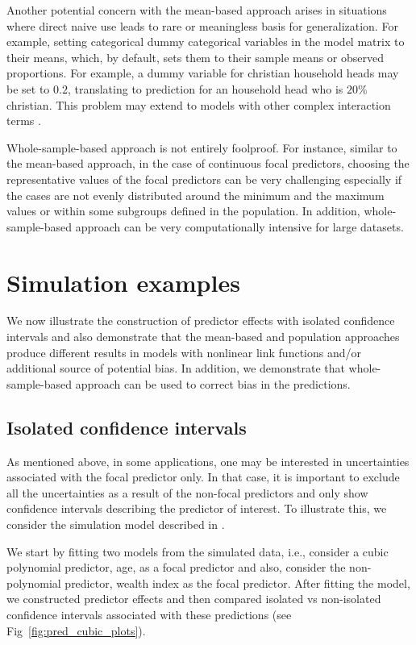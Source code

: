 \documentclass[10pt,letterpaper]{article}
\begin{document}
Another potential concern with the mean-based approach arises in situations where direct naive use leads to rare or meaningless basis for generalization. For example, setting categorical dummy categorical variables in the model matrix to their means, which, by default, sets them to their sample means or observed proportions. For example, a dummy variable for christian household heads may be set to $0.2$, translating to prediction for an household head who is $20\%$ christian. This problem may extend to models with other complex interaction terms \cite{hanmer2013behind}.

Whole-sample-based approach is not entirely foolproof. For instance, similar to the mean-based approach, in the case of continuous focal predictors, choosing the representative values of the focal predictors can be very challenging especially if the cases are not evenly distributed around the minimum and the maximum values or within some subgroups defined in the population. In addition, whole-sample-based approach can be very computationally intensive for large datasets.

\section*{Simulation examples}

We now illustrate the construction of predictor effects with isolated confidence intervals and also demonstrate that the mean-based and population approaches produce different results in models with nonlinear link functions and/or additional source of potential bias. In addition, we demonstrate that whole-sample-based approach can be used to correct bias in the predictions.

\subsection*{Isolated confidence intervals}

As mentioned above, in some applications, one may be interested in uncertainties associated with the focal predictor only. In that case, it is important to exclude all the uncertainties as a result of the non-focal predictors and only show confidence intervals describing the predictor of interest. To illustrate this, we consider the simulation model described in . 

We start by fitting two models from the simulated data, i.e., consider a cubic polynomial predictor, age, as a focal predictor and also, consider the non-polynomial predictor, wealth index as the focal predictor. After fitting the model, we constructed predictor effects and then compared isolated vs non-isolated confidence intervals associated with these predictions (see Fig~\ref{fig:pred_cubic_plots}).
\end{document}
